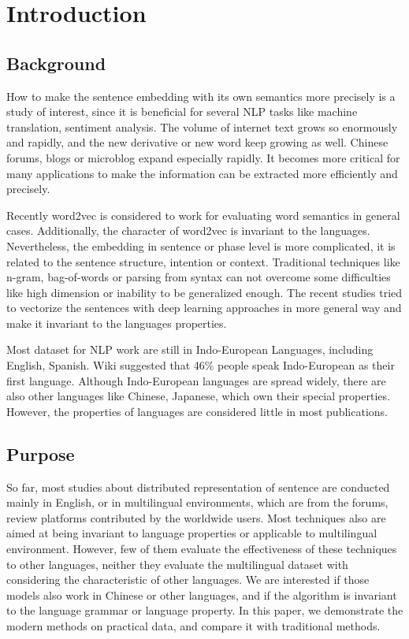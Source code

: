 \chapter{Introduction}
\setlength{\baselineskip}{1.5em}
\setlength{\parindent}{2em}
\setlength{\parskip}{1em}

\section{Background}

How to make the sentence embedding with its own semantics more precisely is a study of interest, since it is beneficial for several NLP tasks like machine translation, sentiment analysis. 
The volume of internet text grows so enormously and rapidly, and the new derivative or new word keep growing as well.
Chinese forums, blogs or microblog expand especially rapidly. 
It becomes more critical for many applications to make the information can be extracted more efficiently and precisely.  

Recently word2vec\cite{word2vec} is considered to work for evaluating word semantics in general cases.  
Additionally, the character of word2vec is invariant to the languages. Nevertheless, 
the embedding in sentence or phase level is more complicated, it is related to the sentence structure, intention or context. 
Traditional techniques like n-gram, bag-of-words or parsing from syntax can not overcome some difficulties like high dimension or inability to be generalized enough.  
The recent studies tried to vectorize the sentences with deep learning approaches in more general way and make it invariant to the languages properties.  


Most dataset for NLP work are still in Indo-European Languages, including English, Spanish. Wiki suggested that 46\% people speak Indo-European as their first language. 
Although Indo-European languages are spread widely, there are also other languages like Chinese, Japanese, which own their special properties.
However, the properties of languages are considered little in most publications.

\section{Purpose}

So far, most studies about distributed representation of sentence are conducted mainly in English, or in multilingual environments, which are from the forums, review platforms contributed by the worldwide users. Most techniques also are aimed at being invariant to language properties or applicable to multilingual environment. 
However, few of them evaluate the effectiveness of these techniques to other languages, neither they evaluate the multilingual dataset with considering the characteristic of other languages.   
We are interested if those models also work in Chinese or other languages, and if the algorithm is invariant to the language grammar or language property. 
In this paper, we demonstrate the modern methods on practical data, and compare it with traditional methods.